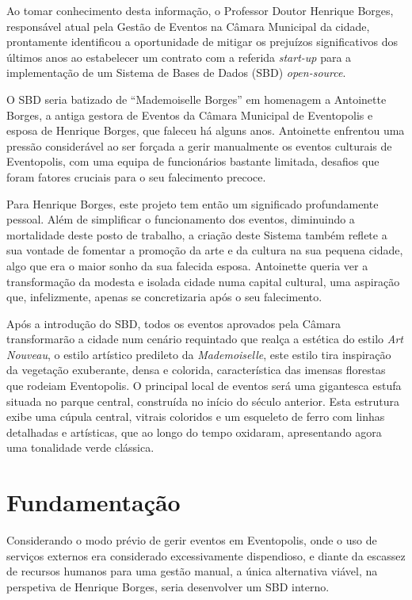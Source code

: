\documentclass[a4paper,12pt]{scrreprt}
\begin{document}
     Ao tomar conhecimento desta informação, o Professor Doutor Henrique Borges, responsável atual
     pela Gestão de Eventos na Câmara Municipal da cidade, prontamente identificou a
     oportunidade de mitigar os prejuízos significativos dos últimos anos ao estabelecer
     um contrato com a referida \textit{start-up} para a implementação de um Sistema de Bases de Dados (SBD) \textit{open-source}.
    
     O SBD seria batizado de ``Mademoiselle Borges'' em homenagem
     a Antoinette Borges, a antiga gestora de Eventos da Câmara Municipal de Eventopolis
     e esposa de Henrique Borges, que faleceu há alguns anos. Antoinette enfrentou uma pressão considerável ao ser forçada a gerir manualmente os eventos culturais de Eventopolis, com uma
     equipa de funcionários bastante limitada, desafios que foram fatores cruciais para o seu falecimento precoce.
   
     Para Henrique Borges, este projeto tem então um significado profundamente pessoal.
     Além de simplificar o funcionamento dos eventos, diminuindo a mortalidade deste posto de trabalho,
     a criação deste Sistema também reflete a sua vontade de fomentar a promoção da arte e da cultura
     na sua pequena cidade, algo que era o maior sonho da sua falecida esposa.
     Antoinette queria ver a transformação da modesta e isolada cidade numa capital cultural,
     uma aspiração que, infelizmente, apenas se concretizaria após o seu falecimento.
    
     Após a introdução do SBD, todos os eventos aprovados pela Câmara transformarão
     a cidade num cenário requintado que realça a estética do estilo \textit{Art Nouveau},
     o estilo artístico predileto da \textit{Mademoiselle}, este estilo tira inspiração da vegetação exuberante,
     densa e colorida, característica das imensas florestas que rodeiam Eventopolis.
     O principal local de eventos será uma gigantesca estufa situada no parque central,
     construída no início do século anterior. Esta estrutura exibe uma cúpula central, vitrais coloridos
     e um esqueleto de ferro com linhas detalhadas e artísticas, que ao longo do tempo oxidaram,
     apresentando agora uma tonalidade verde clássica.

    \section{Fundamenta\c{c}\~ao}
    Considerando o modo prévio de gerir eventos em Eventopolis,
    onde o uso de serviços externos era considerado excessivamente dispendioso,
    e diante da escassez de recursos humanos para uma gestão manual, a única alternativa
    viável, na perspetiva de Henrique Borges, seria desenvolver um SBD interno.
\end{document}
